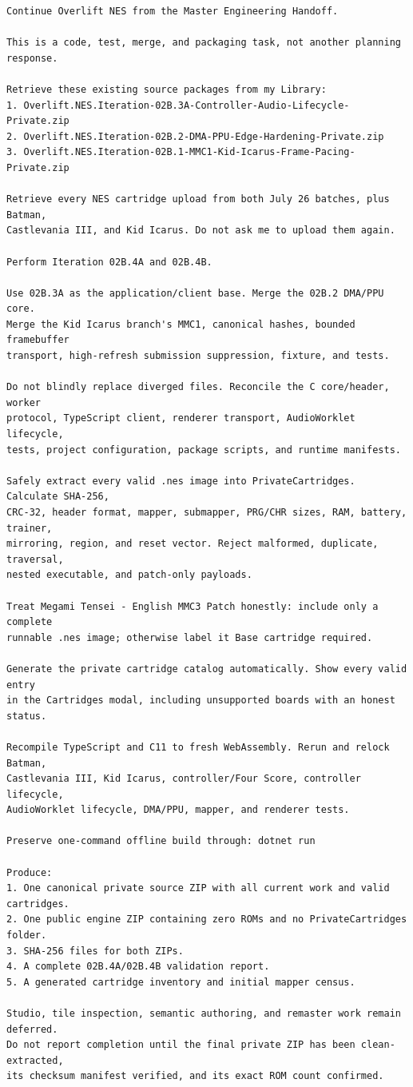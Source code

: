 \documentclass[10pt,letterpaper]{article}
\begin{document}
\begin{Verbatim}[fontsize=\footnotesize]
Continue Overlift NES from the Master Engineering Handoff.

This is a code, test, merge, and packaging task, not another planning response.

Retrieve these existing source packages from my Library:
1. Overlift.NES.Iteration-02B.3A-Controller-Audio-Lifecycle-Private.zip
2. Overlift.NES.Iteration-02B.2-DMA-PPU-Edge-Hardening-Private.zip
3. Overlift.NES.Iteration-02B.1-MMC1-Kid-Icarus-Frame-Pacing-Private.zip

Retrieve every NES cartridge upload from both July 26 batches, plus Batman,
Castlevania III, and Kid Icarus. Do not ask me to upload them again.

Perform Iteration 02B.4A and 02B.4B.

Use 02B.3A as the application/client base. Merge the 02B.2 DMA/PPU core.
Merge the Kid Icarus branch's MMC1, canonical hashes, bounded framebuffer
transport, high-refresh submission suppression, fixture, and tests.

Do not blindly replace diverged files. Reconcile the C core/header, worker
protocol, TypeScript client, renderer transport, AudioWorklet lifecycle,
tests, project configuration, package scripts, and runtime manifests.

Safely extract every valid .nes image into PrivateCartridges. Calculate SHA-256,
CRC-32, header format, mapper, submapper, PRG/CHR sizes, RAM, battery, trainer,
mirroring, region, and reset vector. Reject malformed, duplicate, traversal,
nested executable, and patch-only payloads.

Treat Megami Tensei - English MMC3 Patch honestly: include only a complete
runnable .nes image; otherwise label it Base cartridge required.

Generate the private cartridge catalog automatically. Show every valid entry
in the Cartridges modal, including unsupported boards with an honest status.

Recompile TypeScript and C11 to fresh WebAssembly. Rerun and relock Batman,
Castlevania III, Kid Icarus, controller/Four Score, controller lifecycle,
AudioWorklet lifecycle, DMA/PPU, mapper, and renderer tests.

Preserve one-command offline build through: dotnet run

Produce:
1. One canonical private source ZIP with all current work and valid cartridges.
2. One public engine ZIP containing zero ROMs and no PrivateCartridges folder.
3. SHA-256 files for both ZIPs.
4. A complete 02B.4A/02B.4B validation report.
5. A generated cartridge inventory and initial mapper census.

Studio, tile inspection, semantic authoring, and remaster work remain deferred.
Do not report completion until the final private ZIP has been clean-extracted,
its checksum manifest verified, and its exact ROM count confirmed.
\end{Verbatim}
\end{document}
